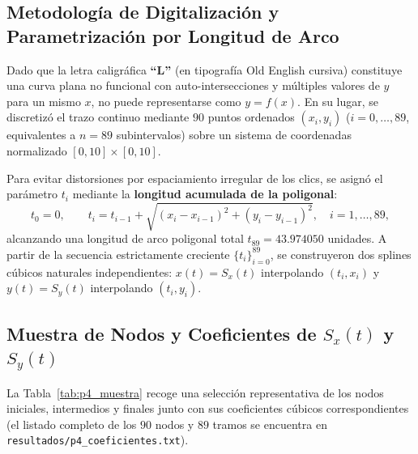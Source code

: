 \documentclass[11pt,letterpaper]{article}
\begin{document}
\subsection{Metodología de Digitalización y Parametrización por Longitud de Arco}
Dado que la letra caligráfica \textbf{``L''} (en tipografía Old English cursiva) constituye una curva plana no funcional con auto-intersecciones y múltiples valores de $y$ para un mismo $x$, no puede representarse como $y = f(x)$. En su lugar, se discretizó el trazo continuo mediante $90$ puntos ordenados $(x_i, y_i)$ ($i = 0, \dots, 89$, equivalentes a $n = 89$ subintervalos) sobre un sistema de coordenadas normalizado $[0, 10] \times [0, 10]$.

Para evitar distorsiones por espaciamiento irregular de los clics, se asignó el parámetro $t_i$ mediante la \textbf{longitud acumulada de la poligonal}:
\begin{equation}
    t_0 = 0, \qquad t_i = t_{i-1} + \sqrt{(x_i - x_{i-1})^2 + (y_i - y_{i-1})^2}, \quad i = 1, \dots, 89,
\end{equation}
alcanzando una longitud de arco poligonal total $t_{89} = 43.974050$ unidades. A partir de la secuencia estrictamente creciente $\{t_i\}_{i=0}^{89}$, se construyeron dos splines cúbicos naturales independientes: $x(t) = S_x(t)$ interpolando $(t_i, x_i)$ y $y(t) = S_y(t)$ interpolando $(t_i, y_i)$.

\subsection{Muestra de Nodos y Coeficientes de $S_x(t)$ y $S_y(t)$}
La Tabla~\ref{tab:p4_muestra} recoge una selección representativa de los nodos iniciales, intermedios y finales junto con sus coeficientes cúbicos correspondientes (el listado completo de los $90$ nodos y $89$ tramos se encuentra en \texttt{resultados/p4\_coeficientes.txt}).
\end{document}

